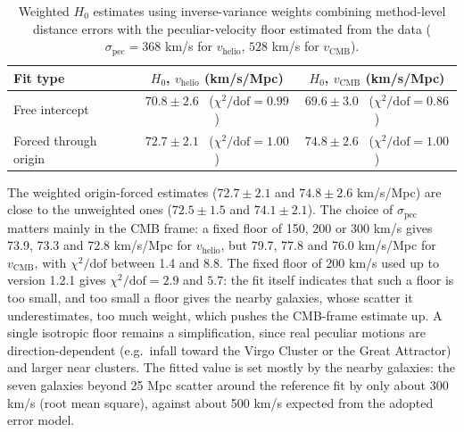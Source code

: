 \documentclass[11pt]{article}
\begin{document}
\begin{table}[htbp]
\centering
\begin{tabular}{lcc}
\toprule
Fit type & $H_0$, $v_{\text{helio}}$ (km/s/Mpc) & $H_0$, $v_{\text{CMB}}$ (km/s/Mpc) \\
\midrule
Free intercept & $70.8 \pm 2.6$ \ ($\chi^2/\text{dof}=0.99$) & $69.6 \pm 3.0$ \ ($\chi^2/\text{dof}=0.86$) \\
Forced through origin & $72.7 \pm 2.1$ \ ($\chi^2/\text{dof}=1.00$) & $74.8 \pm 2.6$ \ ($\chi^2/\text{dof}=1.00$) \\
\bottomrule
\end{tabular}
\caption{Weighted $H_0$ estimates using inverse-variance weights combining method-level distance errors with the peculiar-velocity floor estimated from the data ($\sigma_{\text{pec}} = 368$ km/s for $v_{\text{helio}}$, $528$ km/s for $v_{\text{CMB}}$).}
\label{tab:weighted_results}
\end{table}

The weighted origin-forced estimates ($72.7 \pm 2.1$ and $74.8 \pm 2.6$ km/s/Mpc) are close to the unweighted ones ($72.5 \pm 1.5$ and $74.1 \pm 2.1$). The choice of $\sigma_{\text{pec}}$ matters mainly in the CMB frame: a fixed floor of 150, 200 or 300 km/s gives 73.9, 73.3 and 72.8 km/s/Mpc for $v_{\text{helio}}$, but 79.7, 77.8 and 76.0 km/s/Mpc for $v_{\text{CMB}}$, with $\chi^2/\text{dof}$ between 1.4 and 8.8. The fixed floor of 200 km/s used up to version 1.2.1 gives $\chi^2/\text{dof} = 2.9$ and $5.7$: the fit itself indicates that such a floor is too small, and too small a floor gives the nearby galaxies, whose scatter it underestimates, too much weight, which pushes the CMB-frame estimate up. A single isotropic floor remains a simplification, since real peculiar motions are direction-dependent (e.g.\ infall toward the Virgo Cluster or the Great Attractor) and larger near clusters. The fitted value is set mostly by the nearby galaxies: the seven galaxies beyond 25 Mpc scatter around the reference fit by only about 300 km/s (root mean square), against about 500 km/s expected from the adopted error model.
\end{document}
